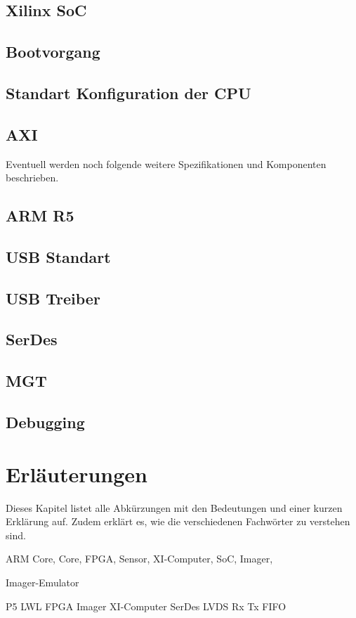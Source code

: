 \documentclass{article}
\begin{document}
\subsection{Xilinx SoC}
\subsection{Bootvorgang}
\subsection{Standart Konfiguration der CPU}
\subsection{AXI}

Eventuell werden noch folgende weitere Spezifikationen und Komponenten be\-schrieben.
\subsection{ARM R5}
\subsection{USB Standart}
\subsection{USB Treiber}
\subsection{SerDes}
\subsection{MGT}
\subsection{Debugging}

\section{Erläuterungen}
Dieses Kapitel listet alle Abkürzungen mit den Bedeutungen und einer kurzen Erklärung auf. Zudem erklärt es, wie die verschiedenen Fachwörter zu verstehen sind.

ARM Core,
Core,
FPGA,
Sensor,
XI-Computer,
SoC,
Imager,

Imager-Emulator

P5
LWL
FPGA
Imager
XI-Computer
SerDes
LVDS
Rx
Tx
FIFO
\end{document}
